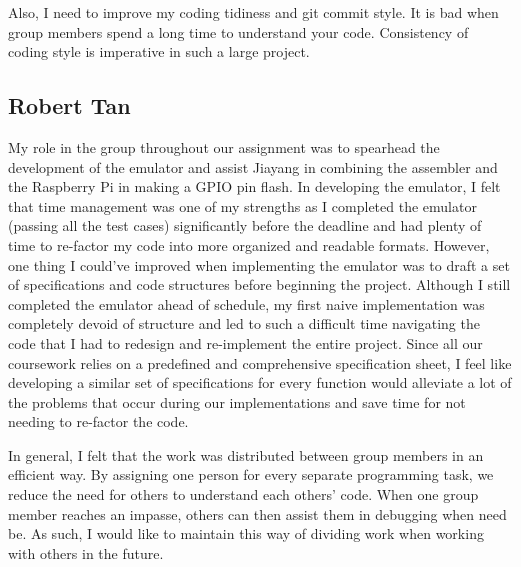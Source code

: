 \documentclass[11pt]{article}
\begin{document}
\noindent
Also, I need to improve my coding tidiness and git commit style. It is bad when group members spend a long time to understand your code. Consistency of coding style is imperative in such a large project.

\subsection{Robert Tan}

My role in the group throughout our assignment was to spearhead the development of the emulator and assist Jiayang in combining the assembler and the Raspberry Pi in making a GPIO pin flash. In developing the emulator, I felt that time management was one of my strengths as I completed the emulator (passing all the test cases) significantly before the deadline and had plenty of time to re-factor my code into more organized and readable formats. However, one thing I could've improved when implementing the emulator was to draft a set of specifications and code structures before beginning the project. Although I still completed the emulator ahead of schedule, my first naive implementation was completely devoid of structure and led to such a difficult time navigating the code that I had to redesign and re-implement the entire project. Since all our coursework relies on a predefined and comprehensive specification sheet, I feel like developing a similar set of specifications for every function would alleviate a lot of the problems that occur during our implementations and save time for not needing to re-factor the code.

\noindent
\newline
In general, I felt that the work was distributed between group members in an efficient way. By assigning one person for every separate programming task, we reduce the need for others to understand each others' code. When one group member reaches an impasse, others can then assist them in debugging when need be. As such, I would like to maintain this way of dividing work when working with others in the future.
\end{document}
